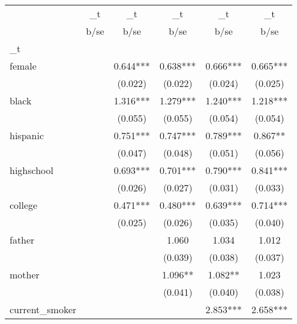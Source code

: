 {
\def\sym#1{\ifmmode^{#1}\else\(^{#1}\)\fi}
\begin{tabular}{l*{5}{c}}
\hline\hline
                &\multicolumn{1}{c}{\_t}&\multicolumn{1}{c}{\_t}&\multicolumn{1}{c}{\_t}&\multicolumn{1}{c}{\_t}&\multicolumn{1}{c}{\_t}\\
                &        b/se   &        b/se   &        b/se   &        b/se   &        b/se   \\
\hline
\_t              &               &               &               &               &               \\
female          &               &       0.644***&       0.638***&       0.666***&       0.665***\\
                &               &     (0.022)   &     (0.022)   &     (0.024)   &     (0.025)   \\
black           &               &       1.316***&       1.279***&       1.240***&       1.218***\\
                &               &     (0.055)   &     (0.055)   &     (0.054)   &     (0.054)   \\
hispanic        &               &       0.751***&       0.747***&       0.789***&       0.867** \\
                &               &     (0.047)   &     (0.048)   &     (0.051)   &     (0.056)   \\
highschool      &               &       0.693***&       0.701***&       0.790***&       0.841***\\
                &               &     (0.026)   &     (0.027)   &     (0.031)   &     (0.033)   \\
college         &               &       0.471***&       0.480***&       0.639***&       0.714***\\
                &               &     (0.025)   &     (0.026)   &     (0.035)   &     (0.040)   \\
father          &               &               &       1.060   &       1.034   &       1.012   \\
                &               &               &     (0.039)   &     (0.038)   &     (0.037)   \\
mother          &               &               &       1.096** &       1.082** &       1.023   \\
                &               &               &     (0.041)   &     (0.040)   &     (0.038)   \\
current\_smoker  &               &               &               &       2.853***&       2.658***\\

\end{tabular}}
